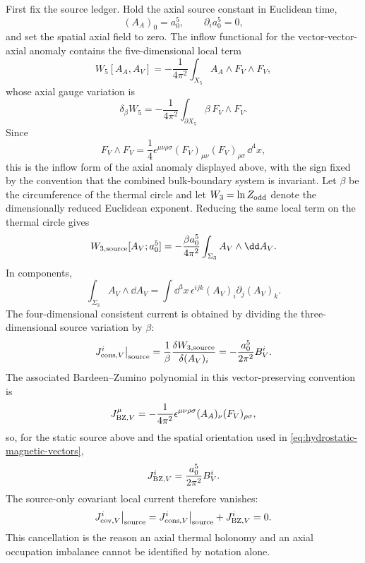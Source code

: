First fix the source ledger.  Hold the axial source constant in Euclidean
time,
\[
  (A_A)_0=a_0^5,\qquad \partial_i a_0^5=0,
\]
and set the spatial axial field to zero.  The inflow functional for the
vector-vector-axial anomaly contains the five-dimensional local term
\[
  W_5[A_A,A_V]
  =
  -\frac1{4\pi^2}
  \int_{X_5} A_A\wedge F_V\wedge F_V ,
\]
whose axial gauge variation is
\[
  \delta_\beta W_5
  =
  -\frac1{4\pi^2}\int_{\partial X_5}\beta\,F_V\wedge F_V .
\]
Since
\[
  F_V\wedge F_V
  =
  \frac14\epsilon^{\mu\nu\rho\sigma}
  (F_V)_{\mu\nu}(F_V)_{\rho\sigma}\,\dd^4x ,
\]
this is the inflow form of the axial anomaly displayed above, with the sign
fixed by the convention that the combined bulk-boundary system is invariant.
Let \(\beta\) be the circumference of the thermal circle and let
\(W_3=\ln Z_{\rm odd}\) denote the dimensionally reduced Euclidean exponent.
Reducing the same local term on the thermal circle gives
\begin{equation}
  W_{3,{\rm source}}[A_V;a_0^5]
  =
  -\frac{\beta a_0^5}{4\pi^2}
  \int_{\Sigma_3} A_V\wedge\dd A_V .
  \label{eq:cme-source-three-functional}
\end{equation}
In components,
\[
  \int_{\Sigma_3} A_V\wedge\dd A_V
  =
  \int\dd^3x\,
  \epsilon^{ijk}(A_V)_i\partial_j(A_V)_k .
\]
The four-dimensional consistent current is obtained by dividing the
three-dimensional source variation by \(\beta\):
\begin{equation}
  J_{{\rm cons},V}^i\big|_{\rm source}
  =
  \frac1\beta
  \frac{\delta W_{3,{\rm source}}}{\delta (A_V)_i}
  =
  -\frac{a_0^5}{2\pi^2}
  B_V^i .
  \label{eq:cme-source-only-consistent-current}
\end{equation}
The associated Bardeen--Zumino polynomial in this vector-preserving
convention is
\begin{equation}
  J_{{\rm BZ},V}^\mu
  =
  -\frac1{4\pi^2}
  \epsilon^{\mu\nu\rho\sigma}
  (A_A)_\nu(F_V)_{\rho\sigma},
  \label{eq:cme-vector-bz-current}
\end{equation}
so, for the static source above and the spatial orientation used in
\eqref{eq:hydrostatic-magnetic-vectors},
\[
  J_{{\rm BZ},V}^i
  =
  \frac{a_0^5}{2\pi^2}B_V^i .
\]
The source-only covariant local current therefore vanishes:
\begin{equation}
  J_{{\rm cov},V}^i\big|_{\rm source}
  =
  J_{{\rm cons},V}^i\big|_{\rm source}
  +J_{{\rm BZ},V}^i
  =
  0 .
  \label{eq:cme-source-only-covariant-current}
\end{equation}
This cancellation is the reason an axial thermal holonomy and an axial
occupation imbalance cannot be identified by notation alone.


